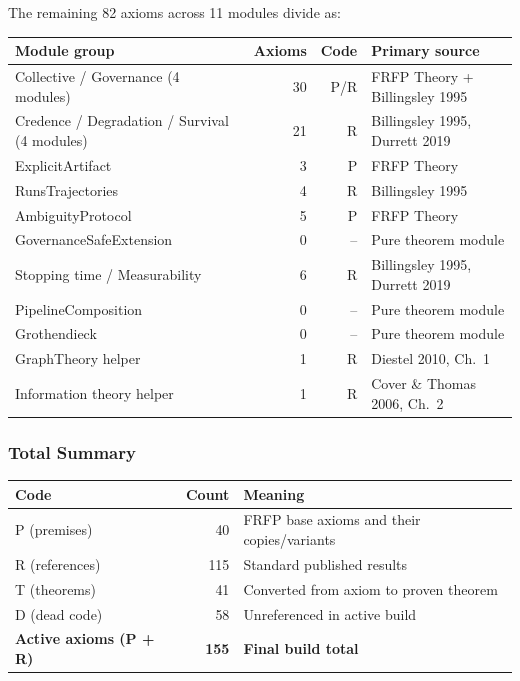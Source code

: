 The remaining 82 axioms across 11 modules divide as:

\begin{center}
\begin{tabular}{lrrl}
\toprule
Module group & Axioms & Code & Primary source \\
\midrule
Collective / Governance (4 modules) & 30 & P/R & FRFP Theory + Billingsley 1995 \\
Credence / Degradation / Survival (4 modules) & 21 & R & Billingsley 1995, Durrett 2019 \\
ExplicitArtifact & 3 & P & FRFP Theory \\
RunsTrajectories & 4 & R & Billingsley 1995 \\
AmbiguityProtocol & 5 & P & FRFP Theory \\
GovernanceSafeExtension & 0 & -- & Pure theorem module \\
Stopping time / Measurability & 6 & R & Billingsley 1995, Durrett 2019 \\
PipelineComposition & 0 & -- & Pure theorem module \\
Grothendieck & 0 & -- & Pure theorem module \\
\midrule
GraphTheory helper & 1 & R & Diestel 2010, Ch.~1 \\
Information theory helper & 1 & R & Cover \& Thomas 2006, Ch.~2 \\
\bottomrule
\end{tabular}
\end{center}

\subsubsection*{Total Summary}

\begin{center}
\begin{tabular}{lrl}
\toprule
Code & Count & Meaning \\
\midrule
P (premises) & 40 & FRFP base axioms and their copies/variants \\
R (references) & 115 & Standard published results \\
T (theorems) & 41 & Converted from axiom to proven theorem \\
D (dead code) & 58 & Unreferenced in active build \\
\midrule
\textbf{Active axioms (P + R)} & \textbf{155} & \textbf{Final build total} \\
\bottomrule
\end{tabular}
\end{center}

